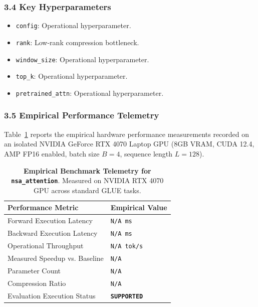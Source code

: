 \subsubsection*{3.4 Key Hyperparameters}
\begin{itemize}
    \item \texttt{config}: Operational hyperparameter.
    \item \texttt{rank}: Low-rank compression bottleneck.
    \item \texttt{window\_size}: Operational hyperparameter.
    \item \texttt{top\_k}: Operational hyperparameter.
    \item \texttt{pretrained\_attn}: Operational hyperparameter.
\end{itemize}

\subsubsection*{3.5 Empirical Performance Telemetry}
Table~\ref{tab:telemetry_nsa_attention} reports the empirical hardware performance measurements recorded on an isolated NVIDIA GeForce RTX 4070 Laptop GPU (8GB VRAM, CUDA 12.4, AMP FP16 enabled, batch size $B=4$, sequence length $L=128$).

\begin{table}[h]
\centering
\small
\caption{\textbf{Empirical Benchmark Telemetry for \texttt{nsa\_attention}}. Measured on NVIDIA RTX 4070 GPU across standard GLUE tasks.}
\label{tab:telemetry_nsa_attention}
\begin{tabularx}{\columnwidth}{lX}
\toprule
\textbf{Performance Metric} & \textbf{Empirical Value} \\
\midrule
Forward Execution Latency & \texttt{N/A ms} \\
Backward Execution Latency & \texttt{N/A ms} \\
Operational Throughput & \texttt{N/A tok/s} \\
Measured Speedup vs. Baseline & \texttt{N/A} \\
Parameter Count & \texttt{N/A} \\
Compression Ratio & \texttt{N/A} \\
Evaluation Execution Status & \textbf{\texttt{SUPPORTED}} \\
\bottomrule
\end{tabularx}
\end{table}

